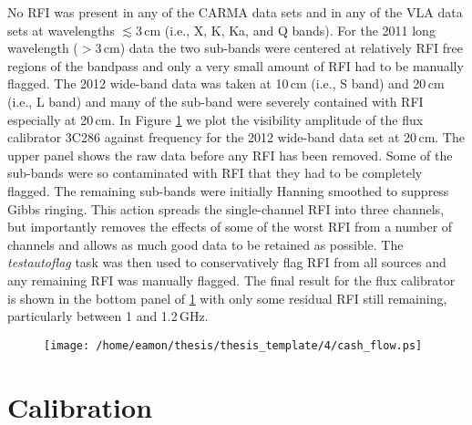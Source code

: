 No RFI was present in any of the CARMA data sets and in any of the VLA data sets at wavelengths $\lesssim 3$\,cm (i.e., X, K, Ka, and Q bands). For the 2011 long wavelength ($> 3$\,cm) data the two sub-bands were centered at relatively RFI free regions of the bandpass and only a very small amount of RFI had to be manually flagged. The 2012 wide-band data was taken at 10\,cm (i.e., S band) and 20\,cm (i.e., L band) and many of the sub-band were severely contained with RFI especially at 20\,cm. In Figure \ref{fig:4.3} we plot the visibility amplitude of the flux calibrator 3C286 against frequency for the 2012 wide-band data set at 20\,cm. The upper panel shows the raw data before any RFI has been removed. Some of the sub-bands were so contaminated with RFI that they had to be completely flagged. The remaining sub-bands were initially Hanning smoothed to suppress Gibbs ringing. This action spreads the single-channel RFI into three channels, but importantly removes the effects of some of the worst RFI from a number of channels and allows as much good data to be retained as possible. The \textit{testautoflag} task was then used to conservatively flag RFI from all sources and any remaining RFI was manually flagged. The final result for the flux calibrator is shown in the bottom panel of \ref{fig:4.3} with only some residual RFI still remaining, particularly between 1 and 1.2\,GHz.

\begin{figure}[hbt!]
\centering 
\texttt{[image: /home/eamon/thesis/thesis\_template/4/cash\_flow.ps]}  
\caption[]{}
\label{fig:4.3}
\end{figure}

\section{Calibration}\label{sec:4.2}

